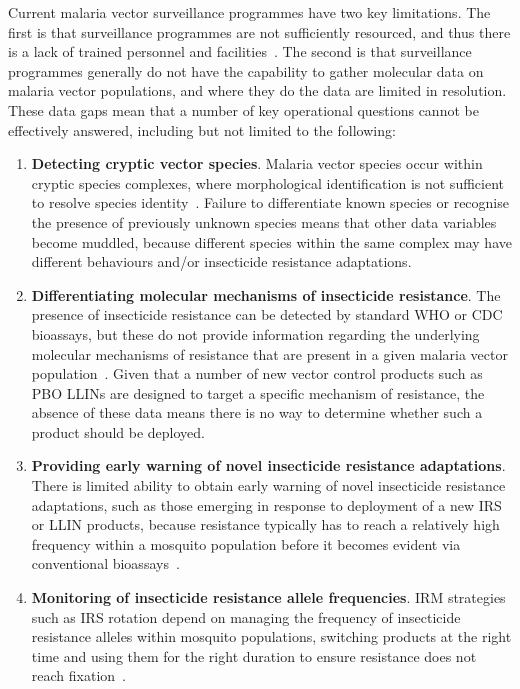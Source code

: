 \begin{refsection}
Current malaria vector surveillance programmes have two key limitations.
%
The first is that surveillance programmes are not sufficiently resourced, and thus there is a lack of trained personnel and facilities~\parencite{Russell2020}.
%
The second is that surveillance programmes generally do not have the capability to gather molecular data on malaria vector populations, and where they do the data are limited in resolution.
%
These data gaps mean that a number of key operational questions cannot be effectively answered, including but not limited to the following:
\begin{enumerate}
%
\item \textbf{Detecting cryptic vector species}. 
%
Malaria vector species occur within cryptic species complexes, where morphological identification is not sufficient to resolve species identity~\parencite{Davidson1964,Coetzee2013}. 
%
Failure to differentiate known species or recognise the presence of previously unknown species means that other data variables become muddled, because different species within the same complex may have different behaviours and/or insecticide resistance adaptations.
%
\item \textbf{Differentiating molecular mechanisms of insecticide resistance}.
%
The presence of insecticide resistance can be detected by standard WHO or CDC bioassays, but these do not provide information regarding the underlying molecular mechanisms of resistance that are present in a given malaria vector population~\parencite{WHO2018TPIRM}.
%
Given that a number of new vector control products such as PBO LLINs are designed to target a specific mechanism of resistance, the absence of these data means there is no way to determine whether such a product should be deployed.
%
\item \textbf{Providing early warning of novel insecticide resistance adaptations}.
%
There is limited ability to obtain early warning of novel insecticide resistance adaptations, such as those emerging in response to deployment of a new IRS or LLIN products, because resistance typically has to reach a relatively high frequency within a mosquito population before it becomes evident via conventional bioassays~\parencite{Roush1986,Sternberg2018}.
%
\item \textbf{Monitoring of insecticide resistance allele frequencies}.
%
IRM strategies such as IRS rotation depend on managing the frequency of insecticide resistance alleles within mosquito populations, switching products at the right time and using them for the right duration to ensure resistance does not reach fixation~\parencite{South2018}. 

\end{enumerate}
\end{refsection}
